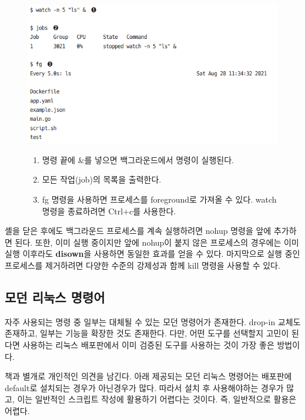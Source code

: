 \begin{figure}[H]
    \includegraphics[width=15cm]{resource/3-job-control}
    \label{fig:job-control}
    \begin{enumerate}
        \item 명령 끝에 \&를 넣으면 백그라운드에서 명령이 실행된다.
        \item 모든 작업(job)의 목록을 출력한다.
        \item fg 명령을 사용하면 프로세스를 foreground로 가져올 수 있다.
            watch 명령을 종료하려면 Ctrl+c를 사용한다.
    \end{enumerate}
\end{figure}

\begin{flushleft}
    셸을 닫은 후에도 백그라운드 프로세스를 계속 실행하려면 nohup 명령을 앞에 추가하면 된다.
    또한, 이미 실행 중이지만 앞에 nohup이 붙지 않은 프로세스의 경우에는
    이미 실행 이후라도 \textbf{disown}을 사용하면 동일한 효과를 얻을 수 있다.
    마지막으로 실행 중인 프로세스를 제거하려면 다양한 수준의 강제성과 함께 kill 명령을 사용할 수 있다.
\end{flushleft}

\subsection*{모던 리눅스 명령어}
\begin{flushleft}
    자주 사용되는 명령 중 일부는 대체될 수 있는 모던 명령어가 존재한다.
    drop-in 교체도 존재하고, 일부는 기능을 확장한 것도 존재한다.
    다만, 어떤 도구를 선택할지 고민이 된다면 사용하는 리눅스 배포판에서
    이미 검증된 도구를 사용하는 것이 가장 좋은 방법이다.
\end{flushleft}

\begin{flushleft}
    책과 별개로 개인적인 의견을 남긴다.
    아래 제공되는 모던 리눅스 명령어는 배포판에 default로 설치되는 경우가 아닌경우가 많다.
    따라서 설치 후 사용해야하는 경우가 많고, 이는 일반적인 스크립트 작성에 활용하기 어렵다는 것이다.
    즉, 일반적으로 활용은 어렵다.
\end{flushleft}

